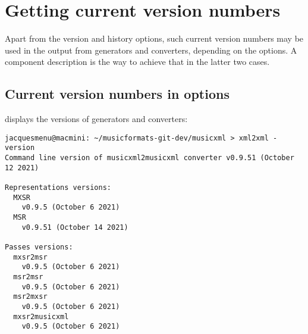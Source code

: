 \section{Getting current version numbers}\label{Getting current version numbers}

Apart from the version and history options, such current version numbers may be used in the output from generators and converters, depending on the options. A component description is the way to achieve that in the latter two cases.


\subsection{Current version numbers in options}\label{Current version numbers in options}

 displays the versions of generators and converters:
\begin{lstlisting}[language=Terminal]
jacquesmenu@macmini: ~/musicformats-git-dev/musicxml > xml2xml -version
Command line version of musicxml2musicxml converter v0.9.51 (October 12 2021)

Representations versions:
  MXSR
    v0.9.5 (October 6 2021)
  MSR
    v0.9.51 (October 14 2021)

Passes versions:
  mxsr2msr
    v0.9.5 (October 6 2021)
  msr2msr
    v0.9.5 (October 6 2021)
  msr2mxsr
    v0.9.5 (October 6 2021)
  mxsr2musicxml
    v0.9.5 (October 6 2021)
\end{lstlisting}

